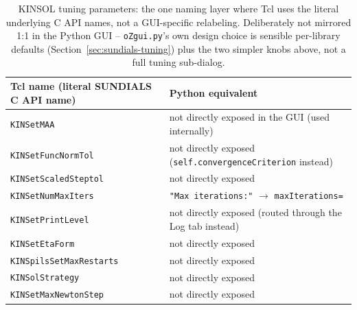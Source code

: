 \documentclass[11pt,a4paper]{article}
\newcommand{\code}[1]{\texttt{#1}}
\begin{document}
\begin{table}[h]
\centering
\small
\begin{tabular}{ll}
\toprule
Tcl name (literal SUNDIALS C API name) & Python equivalent \\
\midrule
\code{KINSetMAA} & not directly exposed in the GUI (used internally) \\
\code{KINSetFuncNormTol} & not directly exposed (\code{self.convergenceCriterion} instead) \\
\code{KINSetScaledSteptol} & not directly exposed \\
\code{KINSetNumMaxIters} & \code{"Max iterations:"} $\to$ \code{maxIterations=} \\
\code{KINSetPrintLevel} & not directly exposed (routed through the Log tab instead) \\
\code{KINSetEtaForm} & not directly exposed \\
\code{KINSpilsSetMaxRestarts} & not directly exposed \\
\code{KINSolStrategy} & not directly exposed \\
\code{KINSetMaxNewtonStep} & not directly exposed \\
\bottomrule
\end{tabular}
\caption{KINSOL tuning parameters: the one naming layer where Tcl uses the
literal underlying C API names, not a GUI-specific relabeling. Deliberately
not mirrored 1:1 in the Python GUI -- \code{oZgui.py}'s own design choice is
sensible per-library defaults (Section~\ref{sec:sundials-tuning}) plus the two
simpler knobs above, not a full tuning sub-dialog.}
\label{tab:kinsol-naming}
\end{table}
\end{document}
